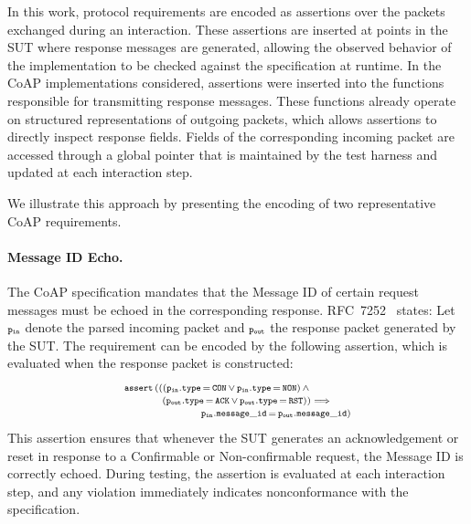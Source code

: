 In this work, protocol requirements are encoded as assertions over the packets exchanged during an interaction.
These assertions are inserted at points in the SUT where response messages are generated, allowing the observed behavior of the implementation to be checked against the specification at runtime.
In the CoAP implementations considered, assertions were inserted into the functions responsible for transmitting response messages.
These functions already operate on structured representations of outgoing packets, which allows assertions to directly inspect response fields.
Fields of the corresponding incoming packet are accessed through a global pointer that is maintained by the test harness and updated at each interaction step.

We illustrate this approach by presenting the encoding of two representative CoAP requirements.


\paragraph{Message ID Echo.}
The CoAP specification mandates that the Message ID of certain request messages must be echoed in the corresponding response.
RFC~7252~\cite[p.~24]{RFC7252} states:
%
%
%
Let $\mathtt{\scriptstyle p_{in}}$ denote the parsed incoming packet and $\mathtt{\scriptstyle p_{out}}$ the response packet generated by the SUT.
The requirement can be encoded by the following assertion, which is evaluated when the response packet is constructed:
%
\begin{equation*}
	\begin{split}
		& \scriptstyle \mathtt{assert} \, (((\mathtt{\scriptstyle p_{in}.type}\, =\, \mathtt{\scriptstyle CON} \, \lor \, \mathtt{\scriptstyle p_{in}.type}\, =\, \mathtt{\scriptstyle NON}) \, \land \, \\[-5pt]
		& \scriptstyle \quad\quad \,\,\,\,\,\,\,(\mathtt{\scriptstyle p_{out}.type}\, =\, \mathtt{\scriptstyle ACK} \, \lor \, \mathtt{\scriptstyle p_{out}.type}\, =\, \mathtt{\scriptstyle RST})) \implies \\[-5pt]
		& \scriptstyle \qquad\qquad\qquad \mathtt{\scriptstyle p_{in}.message\_id}\, =\, \mathtt{\scriptstyle p_{out}.message\_id})
	\end{split}
\end{equation*}
%
This assertion ensures that whenever the SUT generates an acknowledgement or reset in response to a Confirmable or Non-confirmable request, the Message ID is correctly echoed.
During testing, the assertion is evaluated at each interaction step, and any violation immediately indicates nonconformance with the specification.

